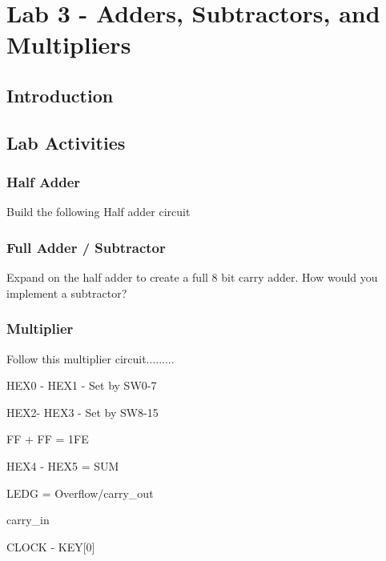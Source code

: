 \section{Lab 3 - Adders, Subtractors, and Multipliers}

\subsection{Introduction}

\subsection{Lab Activities}

\subsubsection{Half Adder}
Build the following Half adder circuit

\subsubsection{Full Adder / Subtractor}
Expand on the half adder to create a full 8 bit carry adder. How would you implement a subtractor?

\subsubsection{Multiplier}
Follow this multiplier circuit.........


HEX0 - HEX1 - Set by SW0-7

HEX2- HEX3 -  Set by SW8-15

FF + FF = 1FE

HEX4 - HEX5 = SUM

LEDG = Overflow/carry_out

carry_in 


CLOCK -  KEY[0]

